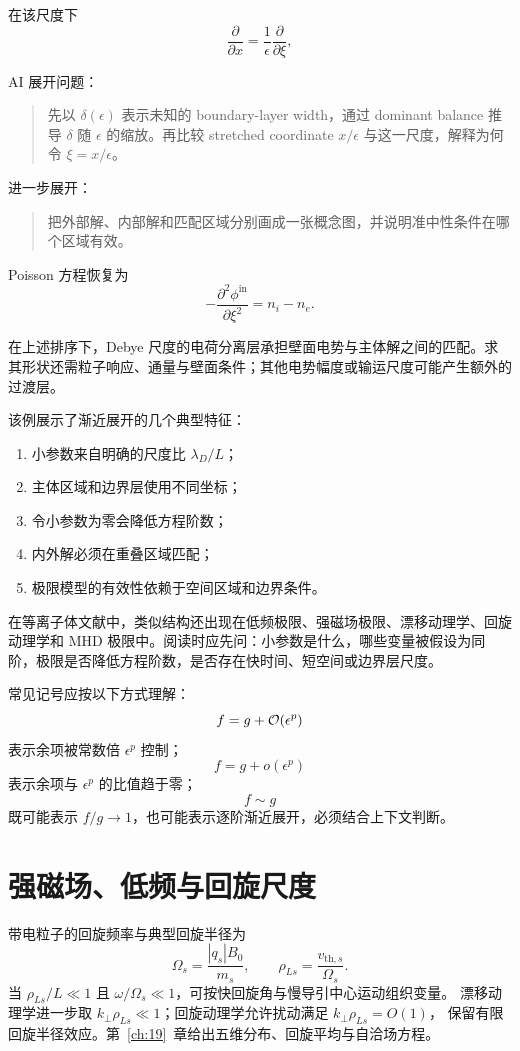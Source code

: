 在该尺度下
\[
\frac{\partial}{\partial x}
=
\frac{1}{\epsilon}\frac{\partial}{\partial\xi},
\]

\begin{askai}
AI 展开问题：
\begin{quote}
先以 \(\delta(\epsilon)\) 表示未知的 boundary-layer width，通过 dominant balance 推导 \(\delta\) 随 \(\epsilon\) 的缩放。再比较 stretched coordinate \(x/\epsilon\) 与这一尺度，解释为何令 \(\xi=x/\epsilon\)。
\end{quote}

进一步展开：
\begin{quote}
把外部解、内部解和匹配区域分别画成一张概念图，并说明准中性条件在哪个区域有效。
\end{quote}
\end{askai}

Poisson 方程恢复为
\[
-\frac{\partial^2\phi^{\mathrm{in}}}{\partial\xi^2}
=
n_i-n_e.
\]

在上述排序下，Debye 尺度的电荷分离层承担壁面电势与主体解之间的匹配。求其形状还需粒子响应、通量与壁面条件；其他电势幅度或输运尺度可能产生额外的过渡层。

该例展示了渐近展开的几个典型特征：
\begin{enumerate}
  \item 小参数来自明确的尺度比 \(\lambda_D/L\)；
  \item 主体区域和边界层使用不同坐标；
  \item 令小参数为零会降低方程阶数；
  \item 内外解必须在重叠区域匹配；
  \item 极限模型的有效性依赖于空间区域和边界条件。
\end{enumerate}

在等离子体文献中，类似结构还出现在低频极限、强磁场极限、漂移动理学、回旋动理学和 MHD 极限中。阅读时应先问：小参数是什么，哪些变量被假设为同阶，极限是否降低方程阶数，是否存在快时间、短空间或边界层尺度。

常见记号应按以下方式理解：
\[
f=g+\mathcal O(\epsilon^p)
\]
表示余项被常数倍 \(\epsilon^p\) 控制；
\[
f=g+o(\epsilon^p)
\]
表示余项与 \(\epsilon^p\) 的比值趋于零；
\[
f\sim g
\]
既可能表示 \(f/g\to1\)，也可能表示逐阶渐近展开，必须结合上下文判断。

\section{强磁场、低频与回旋尺度}
带电粒子的回旋频率与典型回旋半径为
\[
\Omega_s=\frac{|q_s|B_0}{m_s},\qquad
\rho_{Ls}=\frac{v_{\mathrm{th},s}}{\Omega_s}.
\]
当 $\rho_{Ls}/L\ll1$ 且 $\omega/\Omega_s\ll1$，可按快回旋角与慢导引中心运动组织变量。
漂移动理学进一步取 $k_\perp\rho_{Ls}\ll1$；回旋动理学允许扰动满足 $k_\perp\rho_{Ls}=O(1)$，
保留有限回旋半径效应。第~\ref{ch:19}~章给出五维分布、回旋平均与自洽场方程。
